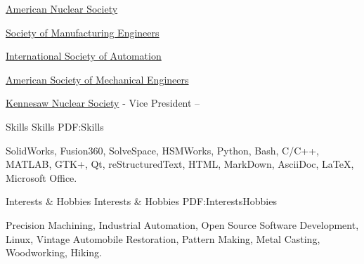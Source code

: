 \documentclass[
letterpaper,
MMMyyyy,
nonstopmode,
draftmode,
]{resume}
\begin{document}
\begin{Body}
\BulletItem
\href{http://www.ans.org/}
{American Nuclear Society}

\BulletItem
\href{http://www.sme.org/}
{Society of Manufacturing Engineers}

\BulletItem
\href{http://www.isa.org/}
{International Society of Automation}

\BulletItem
\href{http://www.asme.org/}
{American Society of Mechanical Engineers}

\BulletItem
\href{https://owllife.kennesaw.edu/organization/KNS}
{Kennesaw Nuclear Society} -
Vice President
\hfill
{} -- 



\Section
{Skills}
{Skills}
{PDF:Skills}

\Entry
SolidWorks, Fusion360, SolveSpace, HSMWorks,
Python, Bash, C/C++, MATLAB, GTK+, Qt,
reStructuredText, HTML, MarkDown, AsciiDoc, \LaTeX,
Microsoft Office.



\Section
{Interests \& Hobbies}
{Interests \& Hobbies}
{PDF:InterestsHobbies}

\Entry
Precision Machining,
Industrial Automation,
Open Source Software Development,
Linux,
Vintage Automobile Restoration,
Pattern Making, Metal Casting,
Woodworking, Hiking.

\end{Body}
\end{document}
